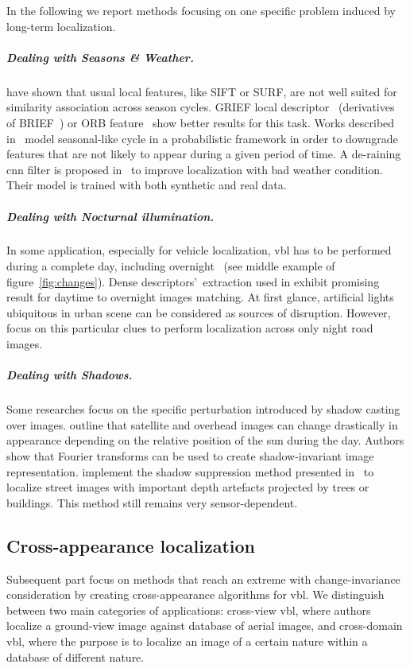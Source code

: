 			In the following we report methods focusing on one specific problem induced by long-term localization. 

			\subparagraph{Dealing with Seasons \& Weather.}
				\citet{Valgren2010} have shown that usual local features, like SIFT or SURF, are not well suited for similarity association across season cycles. GRIEF local descriptor~\citep{Krajnik2017a} (derivatives of BRIEF~\citep{Calonder2010}) or ORB feature~\citep{Griffith2017} show better results for this task. Works described in~\citep{Krajnik2014,Krajnik2017a} model seasonal-like cycle in a probabilistic framework in order to downgrade features that are not likely to appear during a given period of time. A de-raining \ac{cnn} filter is proposed in~\citep{Porav2019} to improve localization with bad weather condition. Their model is trained with both synthetic and real data.
		
			\subparagraph{Dealing with Nocturnal illumination.}
				In some application, especially for vehicle localization, \ac{vbl} has to be performed during a complete day, including overnight~\citep{McManus2014,Milford2015} (see middle example of figure~\ref{fig:changes}). Dense descriptors'~extraction used in \citep{Torii2015} exhibit promising result for daytime to overnight images matching. At first glance, artificial lights ubiquitous in urban scene can be considered as sources of disruption. However, \citet{Nelson2015} focus on this particular clues to perform localization across only night road images. 
				
			\subparagraph{Dealing with Shadows.}
				Some researches focus on the specific perturbation introduced by shadow casting over images. \citet{Wan2016} outline that satellite and overhead images can change drastically in appearance depending on the relative position of the sun during the day. Authors show that Fourier transforms can be used to create shadow-invariant image representation. \citet{Corke2013} implement the shadow suppression method presented in~\citep{Finlayson2006} to localize street images with important depth artefacts projected by trees or buildings. This method still remains very sensor-dependent.

	\subsection{Cross-appearance localization}
	\label{subsec:cross_domain}
		Subsequent part focus on methods that reach an extreme with change-invariance consideration by creating cross-appearance algorithms for \ac{vbl}. We distinguish between two main categories of applications: cross-view \ac{vbl}, where authors localize a ground-view image against database of aerial images, and cross-domain \ac{vbl}, where the purpose is to localize an image of a certain nature within a database of different nature.
		
